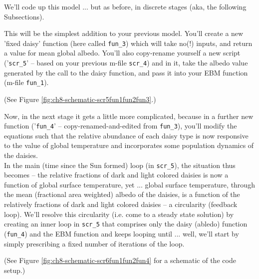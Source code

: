 \documentclass{tufte-book} %
\begin{document}
We'll code up this model ... but as before, in discrete stages (aka, the following Subsections).
\begin{description}[align=right]

\setlength{\itemindent}{-0.2in}

\item [8.2.1] This will be the simplest addition to your previous model. You'll create a new 'fixed daisy' function (here called \texttt{fun\_3}) which will take no(!) inputs, and return a value for mean global albedo. You'll also copy-rename yourself a new script ('\texttt{scr\_5}' -- based on your previous \textsf{m-file} \texttt{scr\_4}) and in it, take the albedo value generated by the call to the daisy function, and pass it into your EBM function (\textsf{m-file} \texttt{fun\_1}).

\noindent (See Figure \ref{fig:ch8-schematic-scr5fun1fun2fun3}.)

\item [8.2.2] Now, in the next stage it gets a little more complicated, because in a further new function ('\texttt{fun\_4}' -- copy-renamed-and-edited from \texttt{fun\_3}), you'll modify the equations such that the relative abundance of each daisy type is now responsive to the value of global temperature and incorporates some population dynamics of the daisies.\\ In the main (time since the Sun formed) loop (in \texttt{scr\_5}), the situation thus becomes -- the relative fractions of dark and light colored daisies is now a function of global surface temperature, yet ... global surface temperature, through the mean (fractional area weighted) albedo of the daisies, is a function of the relatively fractions of dark and light colored daisies -- a circularity (feedback loop). We'll resolve this circularity (i.e. come to a steady state solution) by creating an inner loop in \texttt{scr\_5} that comprises only the daisy (abledo) function (\texttt{fun\_4}) and the EBM function and keeps looping until ... well, we'll start by simply prescribing a fixed number of iterations of the loop.

\noindent (See Figure \ref{fig:ch8-schematic-scr6fun1fun2fun4} for a schematic of the code setup.)


\end{description}
\end{document}
